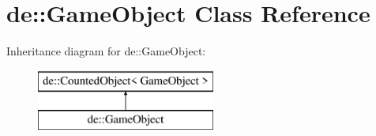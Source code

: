 \hypertarget{classde_1_1_game_object}{
\section{de\-:\-:\-Game\-Object \-Class \-Reference}
\label{classde_1_1_game_object}
}
\-Inheritance diagram for de\-:\-:\-Game\-Object\-:\begin{figure}[H]
\begin{center}
\leavevmode
\includegraphics[height=2.000000cm]{classde_1_1_game_object}
\end{center}
\end{figure}
